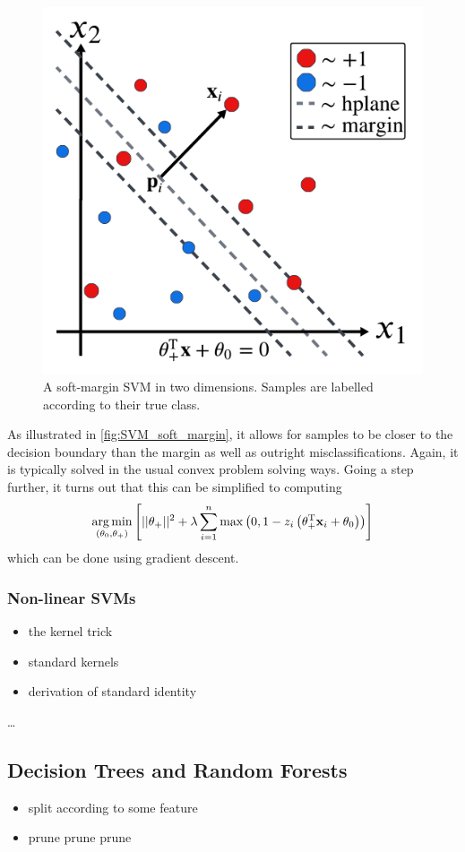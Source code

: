 \documentclass[11pt]{article}
\begin{document}
\begin{figure}[ht]
    \centering
    \includegraphics[width=0.75\columnwidth]{./figures/supervised_learning/SVMs/SVM_soft_margin.pdf}
    \caption{A soft-margin SVM in two dimensions. Samples are labelled according to their true class.}
    \label{fig:SVM_soft_margin}
\end{figure}

\noindent As illustrated in \autoref{fig:SVM_soft_margin}, it allows for samples to be closer to the decision boundary than the margin as well as outright misclassifications. Again, it is typically solved in the usual convex problem solving ways. Going a step further, it turns out that this can be simplified to computing
$$
\operatorname*{arg\,min}_{(\theta_0,\theta_+)}\left[||\theta_+||^2+\lambda\sum_{i=1}^n\max\left(0,1-z_i\left(\theta_+^{\text{T}}\mathbf{x}_i+\theta_0\right)\right)\right]
$$
which can be done using gradient descent.

\subsubsection{Non-linear SVMs}
\begin{itemize}
    \item the kernel trick
    \item standard kernels
    \item derivation of standard identity
\end{itemize}
\dots

\subsection{Decision Trees and Random Forests}
\begin{itemize}
    \item split according to some feature
    \item prune prune prune
\end{itemize}
\end{document}
